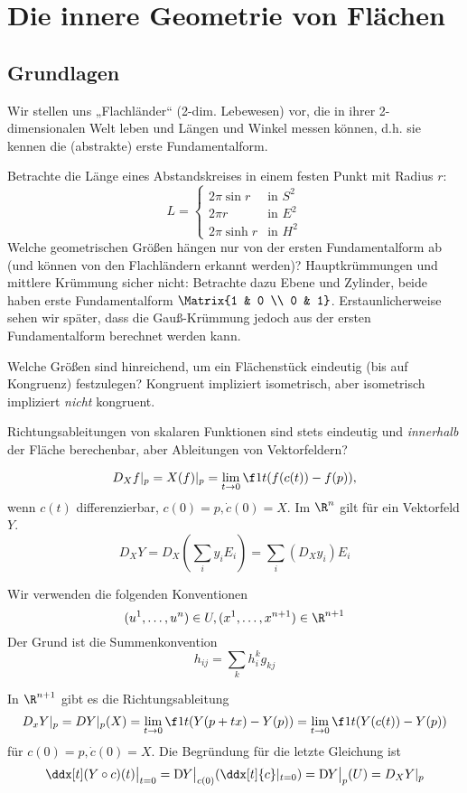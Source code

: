 \chapter{Die innere Geometrie von Flächen}


\section{Grundlagen}

Wir stellen uns „Flachländer“ (2-dim. Lebewesen) vor, die in ihrer 2-dimensionalen Welt leben und Längen und Winkel messen können, d.h. sie kennen die (abstrakte) erste Fundamentalform.

Betrachte die Länge eines Abstandskreises in einem festen Punkt mit Radius $r$:
\[
	L = \begin{cases}
		2\pi \sin r & \text{in $S^2$} \\
		2\pi r & \text{in $E^2$} \\
		2\pi \sinh r & \text{in $H^2$}
	\end{cases}
\]
Welche geometrischen Größen hängen nur von der ersten Fundamentalform ab (und können von den Flachländern erkannt werden)?
Hauptkrümmungen und mittlere Krümmung sicher nicht:
Betrachte dazu Ebene und Zylinder, beide haben erste Fundamentalform $\Matrix{1 & 0 \\ 0 & 1}$.
Erstaunlicherweise sehen wir später, dass die Gauß-Krümmung jedoch aus der ersten Fundamentalform berechnet werden kann.

Welche Größen sind hinreichend, um ein Flächenstück eindeutig (bis auf Kongruenz) festzulegen?
Kongruent impliziert isometrisch, aber isometrisch impliziert \emph{nicht} kongruent.

Richtungsableitungen von skalaren Funktionen sind stets eindeutig und \emph{innerhalb} der Fläche berechenbar, aber Ableitungen von Vektorfeldern?

\[
	D_X f|_p = X(f)|_p
	= \lim_{t\to 0} \f 1t (f(c(t)) - f(p)),
\]
wenn $c(t)$ differenzierbar, $c(0) = p, \dot c(0) = X$.
Im $\R^n$ gilt für ein Vektorfeld $Y$.
\[
	D_X Y = D_X(\sum_{i} y_i E_i)
	= \sum_{i} (D_X y_i) E_i
\]


Wir verwenden die folgenden Konventionen
\[
	(u^1, \dotsc, u^n) \in U,
	(x^1, \dotsc, x^{n+1}) \in \R^{n+1}
\]
Der Grund ist die Summenkonvention
\[
	h_{ij} = \sum_{k} h_i^k g_{kj}
\]

In $\R^{n+1}$ gibt es die Richtungsableitung
\[
	D_xY|_p = DY|_p(X)
	= \lim_{t\to 0} \f 1t (Y(p+tx) - Y(p))
	= \lim_{t\to 0} \f 1t (Y(c(t)) - Y(p))
\]
für $c(0) = p, \dot c(0) = X$.
Die Begründung für die letzte Gleichung ist
\[
	\ddx[t](Y \circ c)(t) \big|_{t=0}
	= \Df[Y]\big|_{c(0)} (\ddx[t]{c}|_{t=0})
	= \Df[Y]\big|_{p}(U)
	= D_X Y|_p
\]

